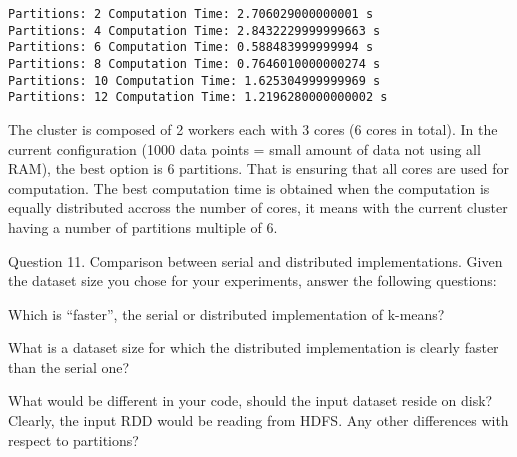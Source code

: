 \documentclass[11pt]{article}
\begin{document}
    \begin{Verbatim}[commandchars=\\\{\}]
Partitions: 2 Computation Time: 2.706029000000001 s
Partitions: 4 Computation Time: 2.8432229999999663 s
Partitions: 6 Computation Time: 0.588483999999994 s
Partitions: 8 Computation Time: 0.7646010000000274 s
Partitions: 10 Computation Time: 1.625304999999969 s
Partitions: 12 Computation Time: 1.2196280000000002 s

    \end{Verbatim}

    The cluster is composed of 2 workers each with 3 cores (6 cores in
total). In the current configuration (1000 data points = small amount of
data not using all RAM), the best option is 6 partitions. That is
ensuring that all cores are used for computation. The best computation
time is obtained when the computation is equally distributed accross the
number of cores, it means with the current cluster having a number of
partitions multiple of 6.

    Question 11. Comparison between serial and distributed implementations.
Given the dataset size you chose for your experiments, answer the
following questions:

Which is ``faster'', the serial or distributed implementation of
k-means?

What is a dataset size for which the distributed implementation is
clearly faster than the serial one?

What would be different in your code, should the input dataset reside on
disk? Clearly, the input RDD would be reading from HDFS. Any other
differences with respect to partitions?


    
    
    
    
\end{document}
